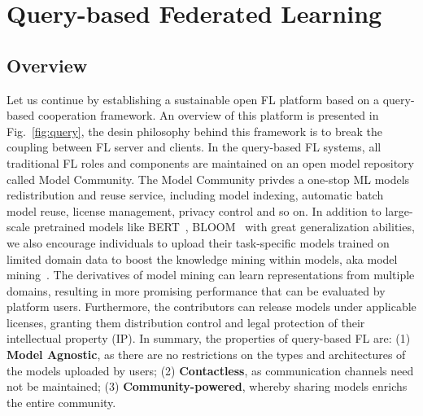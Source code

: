 \section{Query-based Federated Learning}
\label{sec:query}
\subsection{Overview}
\label{sec:query_overview}
Let us continue by establishing a sustainable open FL platform based on a query-based cooperation framework.
An overview of this platform is presented in Fig.~\ref{fig:query}, the desin philosophy behind this framework is to break the coupling between FL server and clients.
In the query-based FL systems, all traditional FL roles and components are maintained on an open model repository called Model Community. The Model Community privdes a one-stop ML models redistribution and reuse service, including model indexing, automatic batch model reuse, license management, privacy control and so on.
In addition to large-scale pretrained models like BERT~\cite{devlin2018bert}, BLOOM~\cite{scao2022bloom} with great generalization abilities, we also encourage individuals to upload their task-specific models trained on limited domain data to boost the knowledge mining within models, aka model mining~\cite{you2021workshop}.
The derivatives of model mining can learn representations from multiple domains, resulting in more promising performance that can be evaluated by platform users.
Furthermore, the contributors can release models under applicable licenses, granting them distribution control and legal protection of their intellectual property (IP).
In summary, the properties of query-based FL are:
(1) \textbf{Model Agnostic}, as there are no restrictions on the types and architectures of the models uploaded by users;
(2) \textbf{Contactless}, as communication channels need not be maintained; 
(3) \textbf{Community-powered}, whereby sharing models enrichs the entire community.

